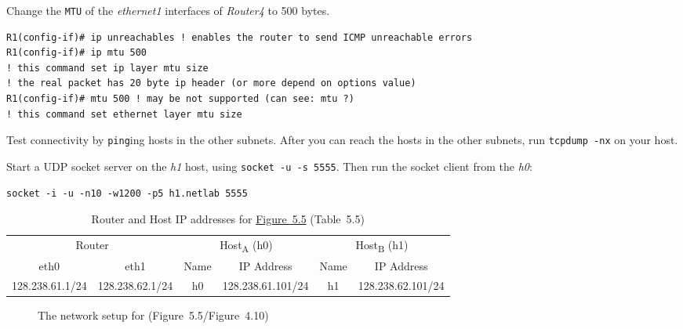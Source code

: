\documentclass{../UTNetLab}
\begin{document}
    Change the \texttt{MTU} of the \textit{ethernet1} interfaces of \textit{Router4} to 500 bytes.
    \begin{lstlisting}[language={cisco}]
R1(config-if)# ip unreachables ! enables the router to send ICMP unreachable errors
R1(config-if)# ip mtu 500
! this command set ip layer mtu size
! the real packet has 20 byte ip header (or more depend on options value)
R1(config-if)# mtu 500 ! may be not supported (can see: mtu ?)
! this command set ethernet layer mtu size
    \end{lstlisting}

    Test connectivity by \lstinline{ping}ing hosts in the other subnets.
    After you can reach the
    hosts in the other subnets, run \lstinline{tcpdump -nx} on your host.

    Start a UDP socket server on the \textit{h1} host, using \lstinline{socket -u -s 5555}.
    Then run the socket client from the \textit{h0}:
    \begin{lstlisting}[emph={h1,netlab}]
socket -i -u -n10 -w1200 -p5 h1.netlab 5555
    \end{lstlisting}

    \begin{table}[H]
        \caption{Router and Host IP addresses for \hyperref[fig:5.5]{Figure~5.5} (Table~5.5)}
        \centering
        \begin{tabular}{ *2c|*2c|*2c }
            \hline \hline
            \multicolumn{2}{c|}{Router} & \multicolumn{2}{c|}{Host\textsubscript{A} (h0)} & \multicolumn{2}{c}{Host\textsubscript{B} (h1)} \\
            eth0 & eth1 & Name & IP Address & Name & IP Address \\
            \hline 
            128.238.61.1/24 & 128.238.62.1/24 & h0 & 128.238.61.101/24 & h1 & 128.238.62.101/24 \\
            \hline \hline
            \end{tabular}
    \end{table}

    \begin{figure}[H]
        \centering
        \caption{The network setup for  (Figure~5.5/Figure~4.10)}
        \label{fig:5.5}
    \end{figure}
\end{document}
